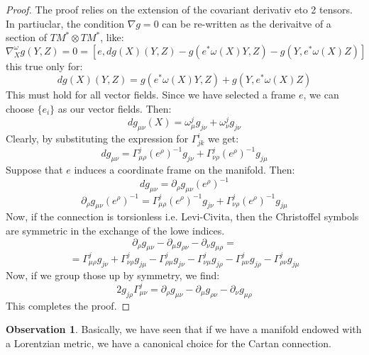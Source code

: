 \documentclass[12pt,a4paper]{report}
\theoremstyle{definition}
\theoremstyle{Theorem}
\theoremstyle{definition}
\theoremstyle{definition}
\newtheorem{Obs}[Def]{Observation}
\begin{document}
		\begin{proof}
			The proof relies on the extension of the covariant derivativ eto 2 tensors. In partiuclar, the condition $\nabla g=0$ can be re-written as the derivaitve of a section of $TM^*\otimes TM^*$, like:
			$$\nabla_X^\omega g(Y,Z)=0=[e,dg(X)(Y,Z)-g(e^*\omega(X)Y,Z)-g(Y,e^*\omega(X)Z)]$$
			this true only for:
			$$dg(X)(Y,Z)=g(e^*\omega(X)Y,Z)+g(Y,e^*\omega(X)Z)$$ 
			This must hold for all vector fields. Since we have selected a frame $e$, we can choose $\{e_i\}$ as our vector fields. Then:
			$$dg_{\mu\nu}(X)=\omega_\mu^jg_{j\nu}+\omega_\nu^jg_{j\nu}$$
			Clearly, by substituting the expression for $\Gamma^i_{jk}$ we get:
			$$dg_{\mu\nu}=\Gamma^j_{\mu\rho}(e^\rho)^{-1}g_{j\nu}+\Gamma^j_{\nu\rho}(e^\rho)^{-1}g_{j\mu}$$
			Suppose that $e$ induces a coordinate frame on the manifold. Then:
			$$dg_{\mu\nu}=\partial_\rho g_{\mu\nu}(e^\rho)^{-1}$$
			$$\partial_\rho g_{\mu\nu}(e^\rho)^{-1}=\Gamma^j_{\mu\rho}(e^\rho)^{-1}g_{j\nu}+\Gamma^j_{\nu\rho}(e^\rho)^{-1}g_{j\mu}$$
			Now, if the connection is torsionless i.e. Levi-Civita, then the Christoffel symbols are symmetric in the exchange of the lowe indices.
			$$\partial_\rho g_{\mu\nu}-\partial_\mu g_{\rho\nu}-\partial_\nu g_{\mu\rho}=$$
			$$=\Gamma^j_{\mu\rho}g_{j\nu}+\Gamma^j_{\nu\rho}g_{j\mu}-
			\Gamma^j_{\rho\mu}g_{j\nu}-\Gamma^j_{\nu\mu}g_{j\rho}-
			\Gamma^j_{\mu\nu}g_{j\rho}-\Gamma^j_{\rho\nu}g_{j\mu}$$
			Now, if we group those up by symmetry, we find:
			$$2g_{j\rho}\Gamma^j_{\mu\nu}=\partial_\rho g_{\mu\nu}-\partial_\mu g_{\rho\nu}-\partial_\nu g_{\mu\rho}$$
			This completes the proof. 
		\end{proof}
		\begin{Obs}
			Basically, we have seen that if we have a manifold endowed with a Lorentzian metric, we have a canonical choice for the Cartan connection.
		\end{Obs}
\end{document}
